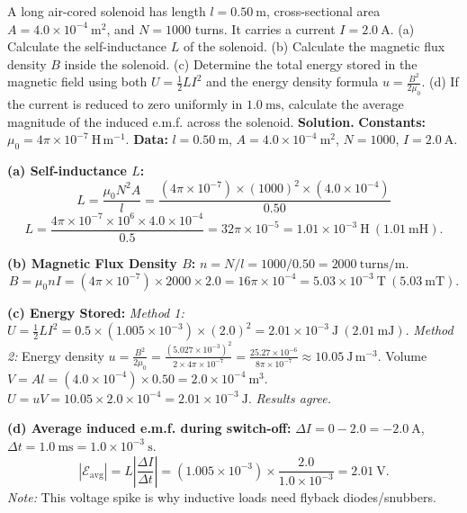 \documentclass[11pt]{article}
\begin{document}
\begin{exoresolu}
A long air-cored solenoid has length $l = 0.50\ \mathrm{m}$, cross-sectional area $A = 4.0 \times 10^{-4}\ \mathrm{m^2}$, and $N = 1000$ turns. It carries a current $I = 2.0\ \mathrm{A}$. (a) Calculate the self-inductance $L$ of the solenoid. (b) Calculate the magnetic flux density $B$ inside the solenoid. (c) Determine the total energy stored in the magnetic field using both $U = \frac{1}{2}LI^2$ and the energy density formula $u = \frac{B^2}{2\mu_0}$. (d) If the current is reduced to zero uniformly in $1.0\ \mathrm{ms}$, calculate the average magnitude of the induced e.m.f. across the solenoid.
\tcblower
\textbf{Solution.}
\textbf{Constants:} $\mu_0 = 4\pi \times 10^{-7}\ \mathrm{H\,m^{-1}}$.
\textbf{Data:} $l=0.50\ \mathrm{m}$, $A=4.0\times 10^{-4}\ \mathrm{m^2}$, $N=1000$, $I=2.0\ \mathrm{A}$.

\textbf{(a) Self-inductance $L$:}
\[
L = \frac{\mu_0 N^2 A}{l} = \frac{(4\pi \times 10^{-7}) \times (1000)^2 \times (4.0 \times 10^{-4})}{0.50}
\]
\[
L = \frac{4\pi \times 10^{-7} \times 10^6 \times 4.0 \times 10^{-4}}{0.5} = 32\pi \times 10^{-5} = \boxed{1.01 \times 10^{-3}\ \mathrm{H}} \ (1.01\ \mathrm{mH}).
\]

\textbf{(b) Magnetic Flux Density $B$:}
$n = N/l = 1000 / 0.50 = 2000\ \mathrm{turns/m}$.
\[
B = \mu_0 n I = (4\pi \times 10^{-7}) \times 2000 \times 2.0 = 16\pi \times 10^{-4} = \boxed{5.03 \times 10^{-3}\ \mathrm{T}} \ (5.03\ \mathrm{mT}).
\]

\textbf{(c) Energy Stored:}
\textit{Method 1:} $U = \frac{1}{2} L I^2 = 0.5 \times (1.005 \times 10^{-3}) \times (2.0)^2 = \boxed{2.01 \times 10^{-3}\ \mathrm{J}} \ (2.01\ \mathrm{mJ})$.
\textit{Method 2:} Energy density $u = \frac{B^2}{2\mu_0} = \frac{(5.027 \times 10^{-3})^2}{2 \times 4\pi \times 10^{-7}} = \frac{25.27 \times 10^{-6}}{8\pi \times 10^{-7}} \approx 10.05\ \mathrm{J\,m^{-3}}$.
Volume $V = A l = (4.0 \times 10^{-4}) \times 0.50 = 2.0 \times 10^{-4}\ \mathrm{m^3}$.
$U = u V = 10.05 \times 2.0 \times 10^{-4} = \boxed{2.01 \times 10^{-3}\ \mathrm{J}}$. \textit{Results agree.}

\textbf{(d) Average induced e.m.f. during switch-off:}
$\Delta I = 0 - 2.0 = -2.0\ \mathrm{A}$, $\Delta t = 1.0\ \mathrm{ms} = 1.0 \times 10^{-3}\ \mathrm{s}$.
\[
|\mathcal{E}_{\text{avg}}| = L \left|\frac{\Delta I}{\Delta t}\right| = (1.005 \times 10^{-3}) \times \frac{2.0}{1.0 \times 10^{-3}} = \boxed{2.01\ \mathrm{V}}.
\]
\textit{Note:} This voltage spike is why inductive loads need flyback diodes/snubbers.
\end{exoresolu}
\end{document}
